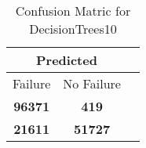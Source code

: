 \begin{table}[] 
\caption{Confusion Matric for DecisionTrees10} 
\label{Table: Prediction Accuracy-DMDDecisionTrees10OnlySunEKF-ignoreReflectionEKF-top2perfectNoFailurePrediction-Reflection} 
\centering 
\begin{tabular} 
 {@{}ccc@{}} 
\toprule 
\multicolumn{2}{c}{\textbf{Predicted}}
 \\ \midrule 
\multicolumn{1}{|c|}{Failure} & 
\multicolumn{1}{c|}{No Failure}
 \\ \midrule 
\multicolumn{1}{|c|}{\color{green}\textbf{96371}} & 
\multicolumn{1}{c|}{\color{red}\textbf{419}}
 \\ \midrule 
\multicolumn{1}{|c|}{\color{red}\textbf{21611}} & 
\multicolumn{1}{c|}{\color{green}\textbf{51727}}
 \\ \bottomrule 
\end{tabular} 
\end{table} 

